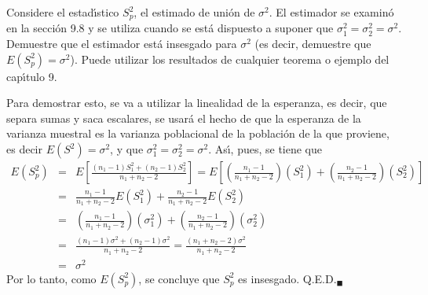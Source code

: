 \begin{enunciado}
 Considere el estad\'{\i}stico $S_p^2$, el estimado de uni\'on de $\sigma^2$. El estimador se examin\'o en la secci\'on 9.8 y se utiliza cuando se est\'a dispuesto a suponer que $\sigma_1^2 = \sigma_2^2 = \sigma^2$. Demuestre que el estimador est\'a insesgado para $\sigma^2$ (es decir, demuestre que $E\left( S_p^2 \right) = \sigma^2$). Puede utilizar los resultados de cualquier teorema o ejemplo del cap\'{\i}tulo 9.
\end{enunciado}

\begin{solucion}
 Para demostrar esto, se va a utilizar la linealidad de la esperanza, es decir, que separa sumas y saca escalares, se usar\'a el hecho de que la esperanza de la varianza muestral es la varianza poblacional de la poblaci\'on de la que proviene, es decir $E\left(S^2 \right) = \sigma^2$, y que $\sigma_1^2 = \sigma_2^2 = \sigma^2$. As\'{\i}, pues, se tiene que
 \begin{eqnarray*}
  E\left( S_p^2 \right) & = & E\left[ \frac{\left( n_1 - 1 \right)S_1^2 + \left( n_2 - 1 \right)S_2^2}{n_1 + n_2 - 2} \right] = E\left[ \left( \frac{n_1-1}{n_1+n_2-2} \right) \left( S_1^2 \right) + \left( \frac{n_2-1}{n_1+n_2-2} \right) \left( S_2^2 \right) \right] \\
  & = & \frac{n_1 - 1}{n_1+n_2-2}E\left( S_1^2 \right) + \frac{n_2 - 1}{n_1+n_2-2}E\left( S_2^2 \right) \\
  & = & \left( \frac{n_1 - 1}{n_1+n_2-2} \right) \left(\sigma_1^2\right) + \left( \frac{n_2 - 1}{n_1+n_2-2} \right) \left(\sigma_2^2\right) \\
  & = & \frac{\left(n_1 - 1\right)\sigma^2 + \left(n_2 - 1\right)\sigma^2}{n_1+n_2-2} = \frac{\left( n_1 + n_2 - 2 \right) \sigma^2}{n_1 + n_2 - 2} \\
  & = & \sigma^2
 \end{eqnarray*}
 Por lo tanto, como $E\left( S_p^2 \right)$, se concluye que $S_p^2$ es insesgado. Q.E.D.${}_{\blacksquare}$
\end{solucion}
